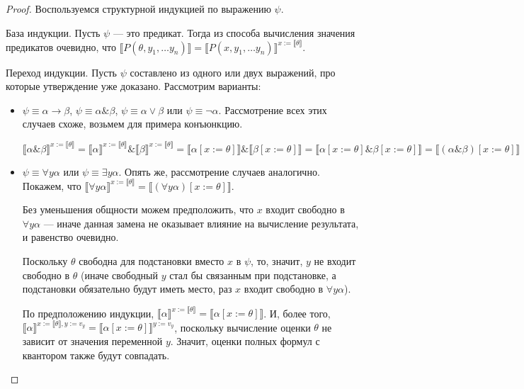 \begin{proof}
Воспользуемся структурной индукцией по выражению $\psi$.

База индукции. Пусть $\psi$ --- это предикат. Тогда из способа вычисления значения предикатов 
очевидно, что
$\llbracket P(\theta,y_1,\dots y_n) \rrbracket = \llbracket P(x,y_1,\dots y_n)\rrbracket^{x := \llbracket \theta \rrbracket}$.

Переход индукции. Пусть $\psi$ составлено из одного или двух выражений, про которые
утверждение уже доказано. Рассмотрим варианты:

\begin{itemize}
\item $\psi \equiv \alpha \rightarrow \beta$, $\psi \equiv \alpha \& \beta$, $\psi \equiv \alpha \vee \beta$ или
$\psi \equiv \neg \alpha$. Рассмотрение всех этих случаев схоже, возьмем для примера конъюнкцию.

$\llbracket\alpha\&\beta\rrbracket^{x:=\llbracket\theta\rrbracket}
=\llbracket\alpha\rrbracket^{x:=\llbracket\theta\rrbracket}\&\llbracket\beta\rrbracket^{x:=\llbracket\theta\rrbracket}
=\llbracket\alpha[x := \theta]\rrbracket\&\llbracket\beta[x:=\theta]\rrbracket
=\llbracket\alpha[x := \theta]\&\beta[x := \theta]\rrbracket = \llbracket(\alpha\&\beta)[x := \theta]\rrbracket$

\item $\psi \equiv \forall y \alpha$ или $\psi \equiv \exists y \alpha$. Опять же, рассмотрение случаев
аналогично. Покажем, что 
$\llbracket \forall y \alpha \rrbracket^{x := \llbracket\theta\rrbracket} = \llbracket (\forall y \alpha)[x:=\theta] \rrbracket$.

Без уменьшения общности можем предположить, что $x$ входит свободно в $\forall y\alpha$ --- иначе данная замена
не оказывает влияние на вычисление результата, и равенство очевидно.

Поскольку $\theta$ свободна для подстановки вместо $x$ в $\psi$, то, значит, 
$y$ не входит свободно в $\theta$ (иначе свободный $y$ стал бы связанным при подстановке,
а подстановки обязательно будут иметь место, раз $x$ входит свободно в $\forall y\alpha$).


По предположению индукции, $\llbracket\alpha\rrbracket^{x := \llbracket\theta\rrbracket} = 
\llbracket\alpha[x:=\theta]\rrbracket$. И, более того,
$\llbracket\alpha\rrbracket^{x := \llbracket\theta\rrbracket, y := v_y} = \llbracket\alpha[x:=\theta]\rrbracket^{y := v_y}$,
поскольку вычисление оценки $\theta$ не зависит от значения переменной $y$.
Значит, оценки полных формул с квантором также будут совпадать.
\end{itemize}

\end{proof}

